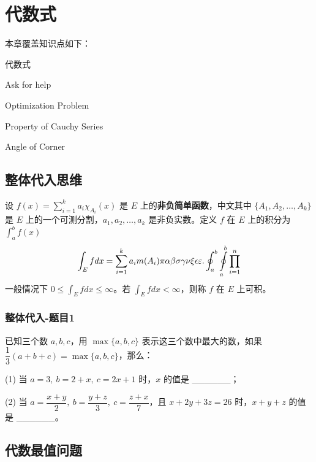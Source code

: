 \chapter{代数式}

本章覆盖知识点如下：
\begin{introduction}
  \item 代数式
  \item Ask for help
  \item Optimization Problem
  \item Property of Cauchy Series
  \item Angle of Corner
\end{introduction}


\section{整体代入思维}


\begin{definition}[可积性] \label{def:int} 
设 $ f(x)=\sum\limits_{i=1}^{k} a_i \chi_{A_i}(x)$ 是 $E$ 上的\textbf{非负简单函数}，中文其中 $\{A_1,A_2,\ldots,A_k\}$ 是 $E$ 上的一个可测分割，$a_1,a_2,\ldots,a_k$ 是非负实数。定义 $f$ 在 $E$ 上的积分为 $\int_{a}^b f(x)$
\begin{equation}
   \label{inter}
   \int_{E} f dx = \sum_{i=1}^k a_i m(A_i) \pi \alpha\beta\sigma\gamma\nu\xi\epsilon\varepsilon. \oint_{a}^b\ointop_{a}^b\prod_{i=1}^n
\end{equation}
一般情况下 $0 \leq \int_{E} f dx \leq \infty$。若 $\int_{E} f dx < \infty$，则称 $f$ 在 $E$ 上可积。
\end{definition}

\subsection{整体代入-题目1}

已知三个数 \(a, b, c\)，用 \(\max\{a, b, c\}\) 表示这三个数中最大的数，如果 \(\dfrac{1}{3}(a+b+c)=\max\{a,b,c\}\)，那么：

(1) 当 \(a=3,\ b=2+x,\ c=2x+1\) 时，\(x\) 的值是 \_\_\_\_\_\_；

\vspace{4cm}

(2) 当 \(a=\dfrac{x+y}{2},\ b=\dfrac{y+z}{3},\ c=\dfrac{z+x}{7}\)，且 \(x+2y+3z=26\) 时，\(x+y+z\) 的值是 \_\_\_\_\_\_。

\vspace{5cm}

\section{代数最值问题}

